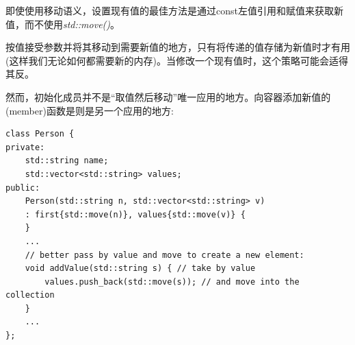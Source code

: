 即使使用移动语义，设置现有值的最佳方法是通过const左值引用和赋值来获取新值，而不使用\textit{std::move()}。\par

按值接受参数并将其移动到需要新值的地方，只有将传递的值存储为新值时才有用(这样我们无论如何都需要新的内存)。当修改一个现有值时，这个策略可能会适得其反。\par

然而，初始化成员并不是“取值然后移动”唯一应用的地方。向容器添加新值的(member)函数是则是另一个应用的地方:\par

\begin{lstlisting}[caption={}]
class Person {
private:
	std::string name;
	std::vector<std::string> values;
public:
	Person(std::string n, std::vector<std::string> v)
	: first{std::move(n)}, values{std::move(v)} {
	}
	...
	// better pass by value and move to create a new element:
	void addValue(std::string s) { // take by value
		values.push_back(std::move(s)); // and move into the collection
	}
	...
};
\end{lstlisting}
























